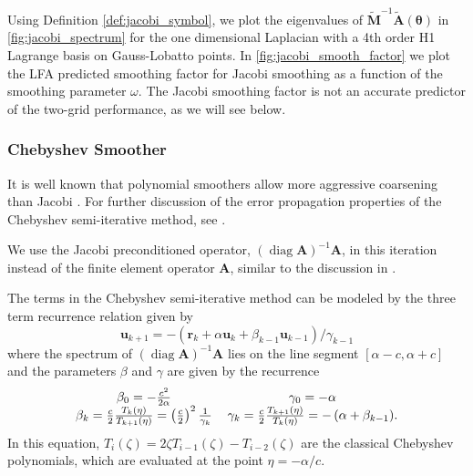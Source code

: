 \documentclass[review]{siamart190516}
\DeclareMathOperator{\diag}{diag}
\begin{document}
Using Definition \ref{def:jacobi_symbol}, we plot the eigenvalues of $\tilde{\mathbf{M}}^{-1} \tilde{\mathbf{A}} \left( \boldsymbol{\theta} \right)$ in \cref{fig:jacobi_spectrum} for the one dimensional Laplacian with a 4th order H1 Lagrange basis on Gauss-Lobatto points.
In \cref{fig:jacobi_smooth_factor} we plot the LFA predicted smoothing factor for Jacobi smoothing as a function of the smoothing parameter $\omega$.
The Jacobi smoothing factor is not an accurate predictor of the two-grid performance, as we will see below.

\subsubsection{Chebyshev Smoother}\label{sec:chebyshev}

It is well known that polynomial smoothers allow more aggressive coarsening than Jacobi \cite{brannick2015polynomial}.
For further discussion of the error propagation properties of the Chebyshev semi-iterative method, see \cite{gutknecht2002revisited}.

We use the Jacobi preconditioned operator, $\left( \diag {\mathbf{A}} \right)^{-1} {\mathbf{A}}$, in this iteration instead of the finite element operator ${\mathbf{A}}$, similar to the discussion in \cite{adams2003parallel}.

The terms in the Chebyshev semi-iterative method can be modeled by the three term recurrence relation given by
\begin{equation}
\mathbf{u}_{k + 1} = - \left( \mathbf{r}_k + \alpha \mathbf{u}_k + \beta_{k - 1} \mathbf{u}_{k - 1} \right) / \gamma_{k - 1}
\label{eq:chebyshev_recursive}
\end{equation}
where the spectrum of $\left( \diag {\mathbf{A}} \right)^{-1} {\mathbf{A}}$ lies on the line segment $\left[ \alpha - c, \alpha + c \right]$ and the parameters $\beta$ and $\gamma$ are given by the recurrence
\begin{equation}
\begin{tabular}{c c}
$\beta_0 = - \frac{c^2}{2 \alpha}$ & $\gamma_0 = - \alpha$\\
$\beta_k = \frac{c}{2} \frac{T_k \left( \eta \right)}{T_{k + 1} \left( \eta \right)} = \left( \frac{c}{2} \right)^2 \frac{1}{\gamma_k}$ & $\gamma_k = \frac{c}{2} \frac{T_{k + 1} \left( \eta \right)}{T_k \left( \eta \right)} = - \left( \alpha + \beta_{k - 1} \right)$.
\end{tabular}
\end{equation}
In this equation, $T_i \left( \zeta \right) = 2 \zeta T_{i - 1} \left( \zeta \right) - T_{i - 2} \left( \zeta \right)$ are the classical Chebyshev polynomials, which are evaluated at the point $\eta = - \alpha / c$.
\end{document}
